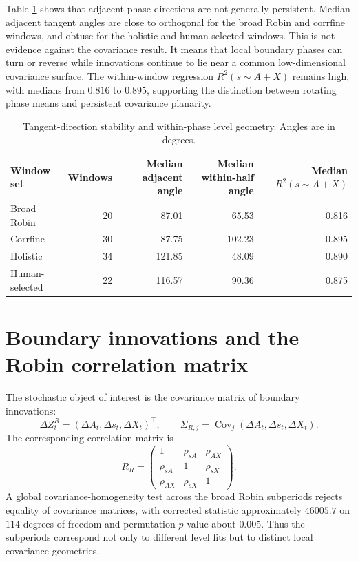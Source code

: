 \documentclass[11pt]{article}
\newcommand{\Cov}{\operatorname{Cov}}
\begin{document}
Table \ref{tab:tangent_stability} shows that adjacent phase directions are not generally persistent. Median adjacent tangent angles are close to orthogonal for the broad Robin and corrfine windows, and obtuse for the holistic and human-selected windows. This is not evidence against the covariance result. It means that local boundary phases can turn or reverse while innovations continue to lie near a common low-dimensional covariance surface. The within-window regression $R^2(s\sim A+X)$ remains high, with medians from $0.816$ to $0.895$, supporting the distinction between rotating phase means and persistent covariance planarity.

\begin{table}[!htbp]
\centering
\small
\begin{tabular}{lrrrr}
\toprule
Window set & Windows & Median adjacent angle & Median within-half angle & Median $R^2(s\sim A+X)$ \\
\midrule
Broad Robin & 20 & 87.01 & 65.53 & 0.816 \\
Corrfine & 30 & 87.75 & 102.23 & 0.895 \\
Holistic & 34 & 121.85 & 48.09 & 0.890 \\
Human-selected & 22 & 116.57 & 90.36 & 0.875 \\
\bottomrule
\end{tabular}
\caption{Tangent-direction stability and within-phase level geometry. Angles are in degrees.}
\label{tab:tangent_stability}
\end{table}

\section{Boundary innovations and the Robin correlation matrix}

The stochastic object of interest is the covariance matrix of boundary innovations:
\begin{equation}
 \Delta Z_t^R=(\Delta A_t,\Delta s_t,\Delta X_t)^\top,
 \qquad
 \Sigma_{R,j}=\Cov_j(\Delta A_t,\Delta s_t,\Delta X_t).
\label{eq:Sigma_R}
\end{equation}
The corresponding correlation matrix is
\begin{equation}
 R_R=
 \begin{pmatrix}
 1 & \rho_{sA} & \rho_{AX}\\
 \rho_{sA} & 1 & \rho_{sX}\\
 \rho_{AX} & \rho_{sX} & 1
 \end{pmatrix}.
\label{eq:RR}
\end{equation}
A global covariance-homogeneity test across the broad Robin subperiods rejects equality of covariance matrices, with corrected statistic approximately $46005.7$ on $114$ degrees of freedom and permutation $p$-value about $0.005$. Thus the subperiods correspond not only to different level fits but to distinct local covariance geometries.
\end{document}
